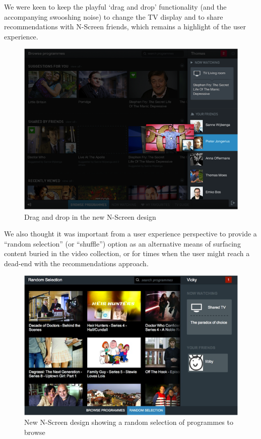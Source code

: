 \documentclass{notube}
\begin{document}
We were keen to keep the playful `drag and drop’ functionality (and the accompanying swooshing noise) to change the TV display and to share recommendations with N-Screen friends, which remains a highlight of the user experience. 

\begin{figure}[htbp]
\begin{center}
\includegraphics[width=6in]{images/dd.png}
\caption{Drag and drop in the new N-Screen design} \label{fig:dd}
\end{center}
\end{figure}

We also thought it was important from a user experience perspective to provide a ``random selection” (or ``shuffle”) option as an alternative means of surfacing content buried in the video collection, or for times when the user might reach a dead-end with the recommendations approach. 

\begin{figure}[htbp]
\begin{center}
\includegraphics[width=6in]{images/random.png}
\caption{New N-Screen design showing a random selection of programmes to browse} \label{fig:random}
\end{center}
\end{figure}
\end{document}
